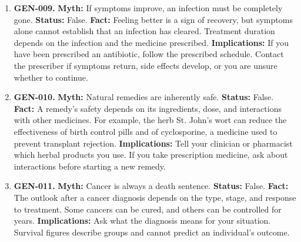 \documentclass[11pt,oneside]{book}
\begin{document}
\begin{enumerate}[leftmargin=0pt,labelwidth=0pt,labelsep=0pt,itemindent=0pt]
\textbf{Status:} False.\newline
\textbf{Fact:} Antibiotics differ in which bacteria they can treat. A narrow-spectrum drug can be an effective first choice when the likely cause is known. A serious infection of uncertain cause may require broader initial coverage.\newline
\textbf{Implications:} If laboratory results identify the bacteria and which drugs will work, the clinician can reassess treatment. Switching to a narrower antibiotic can treat the infection while limiting unnecessary exposure to other antibiotics. \cite{ref296}
\item[] \textbf{GEN-009.} \textbf{Myth:} If symptoms improve, an infection must be completely gone.\newline
\textbf{Status:} False.\newline
\textbf{Fact:} Feeling better is a sign of recovery, but symptoms alone cannot establish that an infection has cleared. Treatment duration depends on the infection and the medicine prescribed.\newline
\textbf{Implications:} If you have been prescribed an antibiotic, follow the prescribed schedule. Contact the prescriber if symptoms return, side effects develop, or you are unsure whether to continue. \cite{ref294}
\item[] \textbf{GEN-010.} \textbf{Myth:} Natural remedies are inherently safe.\newline
\textbf{Status:} False.\newline
\textbf{Fact:} A remedy's safety depends on its ingredients, dose, and interactions with other medicines. For example, the herb St. John's wort can reduce the effectiveness of birth control pills and of cyclosporine, a medicine used to prevent transplant rejection.\newline
\textbf{Implications:} Tell your clinician or pharmacist which herbal products you use. If you take prescription medicine, ask about interactions before starting a new remedy. \cite{ref297}
\item[] \textbf{GEN-011.} \textbf{Myth:} Cancer is always a death sentence.\newline
\textbf{Status:} False.\newline
\textbf{Fact:} The outlook after a cancer diagnosis depends on the type, stage, and response to treatment. Some cancers can be cured, and others can be controlled for years. \cite{ref16}\newline
\textbf{Implications:} Ask what the diagnosis means for your situation. Survival figures describe groups and cannot predict an individual's outcome.

\end{enumerate}
\end{document}
